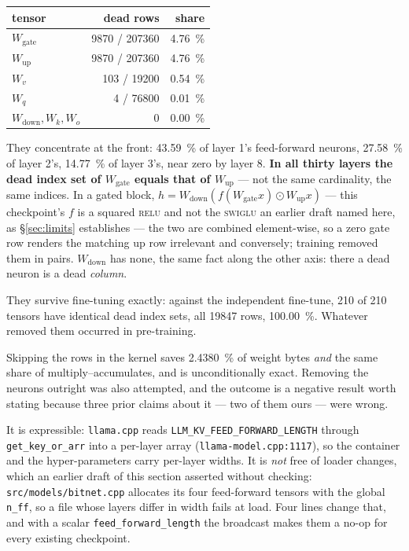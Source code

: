 \documentclass[11pt,a4paper]{article}
\newcommand{\code}[1]{\texttt{#1}}
\begin{document}
\begin{center}
\begin{tabular}{lrr}
\toprule
tensor & dead rows & share \\
\midrule
$W_{\text{gate}}$ & \num{9870} / \num{207360} & \SI{4.76}{\percent} \\
$W_{\text{up}}$   & \num{9870} / \num{207360} & \SI{4.76}{\percent} \\
$W_{v}$           & 103 / \num{19200} & \SI{0.54}{\percent} \\
$W_{q}$           & 4 / \num{76800} & \SI{0.01}{\percent} \\
$W_{\text{down}},W_{k},W_{o}$ & 0 & \SI{0.00}{\percent} \\
\bottomrule
\end{tabular}
\end{center}

They concentrate at the front: \SI{43.59}{\percent} of layer 1's feed-forward
neurons, \SI{27.58}{\percent} of layer 2's, \SI{14.77}{\percent} of layer 3's,
near zero by layer 8. \textbf{In all thirty layers the dead index set of
$W_{\text{gate}}$ equals that of $W_{\text{up}}$} --- not the same cardinality,
the same indices. In a gated block, $h = W_{\text{down}}\!\left(f(W_{\text{gate}}x)\odot W_{\text{up}}x\right)$
--- this checkpoint's $f$ is a squared \textsc{relu} and not the \textsc{swiglu}
an earlier draft named here, as \S\ref{sec:limits} establishes ---
the two are combined element-wise, so a zero
gate row renders the matching up row irrelevant and conversely; training removed
them in pairs. $W_{\text{down}}$ has none, the same fact along the other axis:
there a dead neuron is a dead \emph{column}.

They survive fine-tuning exactly: against the independent fine-tune, 210 of 210
tensors have identical dead index sets, all \num{19847} rows,
\SI{100.00}{\percent}. Whatever removed them occurred in pre-training.

Skipping the rows in the kernel saves \SI{2.4380}{\percent} of weight bytes
\emph{and} the same share of multiply--accumulates, and is unconditionally
exact. Removing the neurons outright was also attempted, and the outcome is a
negative result worth stating because three prior claims about it --- two of
them ours --- were wrong.

It is expressible: \code{llama.cpp} reads \code{LLM\_KV\_FEED\_FORWARD\_LENGTH}
through \code{get\_key\_or\_arr} into a per-layer array
(\code{llama-model.cpp:1117}), so the container and the hyper-parameters carry
per-layer widths. It is \emph{not} free of loader changes, which an earlier
draft of this section asserted without checking:
\code{src/models/bitnet.cpp} allocates its four feed-forward tensors with the
global \code{n\_ff}, so a file whose layers differ in width fails at load. Four
lines change that, and with a scalar \code{feed\_forward\_length} the broadcast
makes them a no-op for every existing checkpoint.
\end{document}
